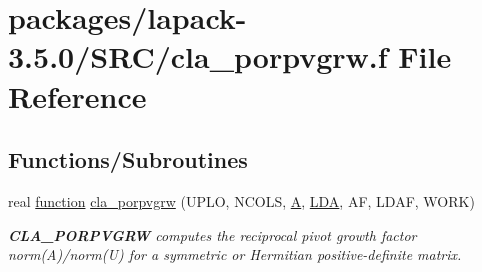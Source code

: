 \hypertarget{cla__porpvgrw_8f}{}\section{packages/lapack-\/3.5.0/\+S\+R\+C/cla\+\_\+porpvgrw.f File Reference}
\label{cla__porpvgrw_8f}
\subsection*{Functions/\+Subroutines}
\begin{DoxyCompactItemize}
\item 
real \hyperlink{afunc_8m_a7b5e596df91eadea6c537c0825e894a7}{function} \hyperlink{group__complexPOcomputational_gac233b27b7668956a58100cbb8e9ee392}{cla\+\_\+porpvgrw} (U\+P\+L\+O, N\+C\+O\+L\+S, \hyperlink{classA}{A}, \hyperlink{example__user_8c_ae946da542ce0db94dced19b2ecefd1aa}{L\+D\+A}, A\+F, L\+D\+A\+F, W\+O\+R\+K)
\begin{DoxyCompactList}\small\item\em {\bfseries C\+L\+A\+\_\+\+P\+O\+R\+P\+V\+G\+R\+W} computes the reciprocal pivot growth factor norm(\+A)/norm(U) for a symmetric or Hermitian positive-\/definite matrix. \end{DoxyCompactList}\end{DoxyCompactItemize}
